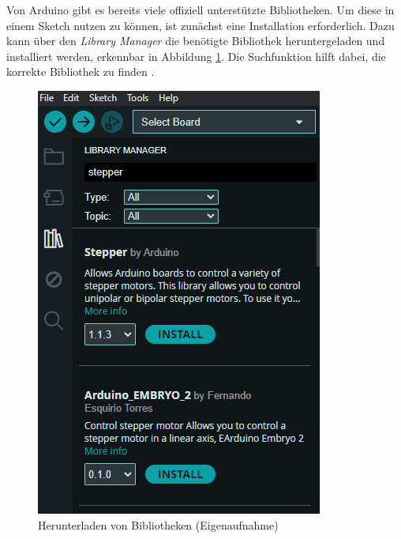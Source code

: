 Von Arduino gibt es bereits viele offiziell unterstützte Bibliotheken. Um diese in einem Sketch nutzen zu können, ist zunächst eine Installation erforderlich.
Dazu kann über den \textit{Library Manager} die benötigte Bibliothek heruntergeladen und installiert werden, erkennbar in Abbildung \ref{Librarymanager}. Die Suchfunktion hilft dabei, die korrekte Bibliothek zu finden \cite{ArdIDE.2024c}.

\begin{figure}[H]
	\begin{center}
		\includegraphics[width=\textwidth]{Images/IDE/Librarymanager} 
		\caption{Herunterladen von Bibliotheken (Eigenaufnahme)} \label{Librarymanager}
	\end{center}
\end{figure}

